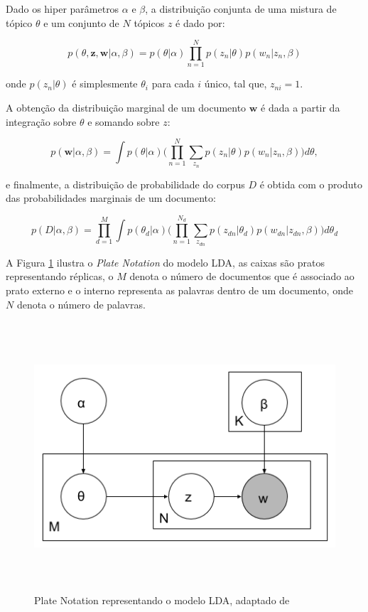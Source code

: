 \documentclass[12pt,a4paper]{article}
\begin{document}
Dado os hiper parâmetros $\alpha$ e $\beta$, a distribuição conjunta de uma mistura de tópico $\theta$ e um conjunto de $N$ tópicos $z$ é dado por:

\begin{equation}
p(\theta,\textbf{z},\textbf{w}|\alpha,\beta) = p(\theta|\alpha) \prod_{n=1}^{N} p(z_n|\theta)p(w_n|z_n,\beta)
\end{equation}

onde $p(z_n | \theta)$ é simplesmente $\theta _i$ para cada $i$ único,
 tal que, $z_{ni}=1$.
 
A obtenção da distribuição marginal de um documento $\textbf{w}$ é dada a partir da integração sobre $\theta$ e somando sobre $z$:

\begin{equation}
p(\textbf{w}|\alpha,\beta)=\int{p(\theta|\alpha)\Bigg(\prod_{n=1}^{N}\sum_{z_n} p(z_n|\theta)p(w_n|z_n,\beta)\Bigg)d\theta},
\end{equation}

e finalmente, a distribuição de probabilidade do corpus $D$ é obtida com o produto das probabilidades marginais de um documento:

\begin{equation}
p(D|\alpha,\beta)= \prod_{d=1}^{M} \int{p(\theta _d|\alpha)\Bigg(\prod_{n=1}^{N_d}\sum_{z_{dn}} p(z_{dn}|\theta _d)p(w_{dn}|z_{dn},\beta)\Bigg)d\theta _d}
\end{equation}


A Figura \ref{fig-plate} ilustra o 	\textit{Plate Notation} do modelo LDA, as caixas são pratos representando réplicas,
o $M$ denota o número de documentos que é associado ao prato externo e o interno representa as palavras dentro de um documento, onde $N$ denota o número de palavras.

\begin{figure}[H]
 \centering
   \includegraphics[height=10cm]{images/figure_1.png}
   \caption{Plate Notation representando o modelo LDA, adaptado de }
   \label{fig-plate}
\end{figure}
\end{document}
